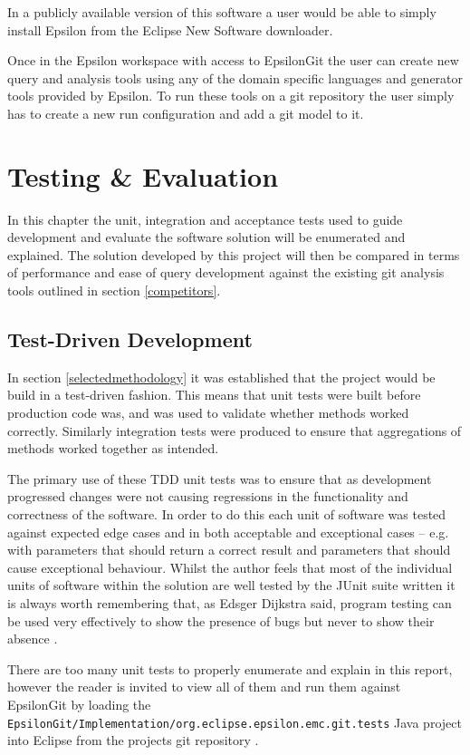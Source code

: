 \documentclass[11pt]{book}
\newcommand{\code}[1]{\texttt{#1}}
\begin{document}
In a publicly available version of this software a user would be able to simply install Epsilon from the Eclipse New Software downloader.

Once in the Epsilon workspace with access to EpsilonGit the user can create new query and analysis tools using any of the domain specific languages and generator tools provided by Epsilon. To run these tools on a git repository the user simply has to create a new run configuration and add a git model to it.


\chapter{Testing \& Evaluation}
\label{testeval}
In this chapter the unit, integration and acceptance tests used to guide development and evaluate the software solution will be enumerated and explained. The solution developed by this project will then be compared in terms of performance and ease of query development against the existing git analysis tools outlined in section \ref{competitors}.

\section{Test-Driven Development}
In section \ref{selectedmethodology} it was established that the project would be build in a test-driven fashion. This means that unit tests were built before production code was, and was used to validate whether methods worked correctly. Similarly integration tests were produced to ensure that aggregations of methods worked together as intended.

The primary use of these TDD unit tests was to ensure that as development progressed changes were not causing regressions in the functionality and correctness of the software. In order to do this each unit of software was tested against expected edge cases and in both acceptable and exceptional cases -- e.g. with parameters that should return a correct result and parameters that should cause exceptional behaviour. Whilst the author feels that most of the individual units of software within the solution are well tested by the JUnit suite written it is always worth remembering that, as Edsger Dijkstra said, program testing can be used very effectively to show the presence of bugs but never to show their absence \cite{edsger}.

There are too many unit tests to properly enumerate and explain in this report, however the reader is invited to view all of them and run them against EpsilonGit by loading the \\  \code{EpsilonGit/Implementation/org.eclipse.epsilon.emc.git.tests} Java project into Eclipse from the projects git repository \cite{epsilongitgithub}.
\end{document}
